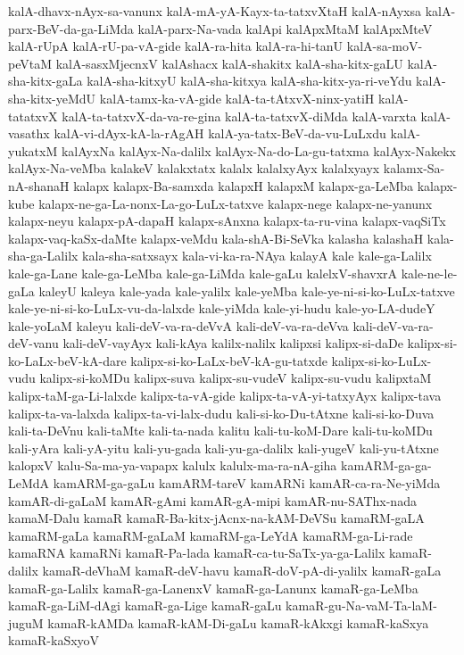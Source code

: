 {kalA-dhavx-nAyx-sa-vanunx
kalA-mA-yA-Kayx-ta-tatxvXtaH
kalA-nAyxsa
kalA-parx-BeV-da-ga-LiMda
kalA-parx-Na-vada
kalApi
kalApxMtaM
kalApxMteV
kalA-rUpA
kalA-rU-pa-vA-gide
kalA-ra-hita
kalA-ra-hi-tanU
kalA-sa-moV-peVtaM
kalA-sasxMjecnxV
kalAshacx
kalA-shakitx
kalA-sha-kitx-gaLU
kalA-sha-kitx-gaLa
kalA-sha-kitxyU
kalA-sha-kitxya
kalA-sha-kitx-ya-ri-veYdu
kalA-sha-kitx-yeMdU
kalA-tamx-ka-vA-gide
kalA-ta-tAtxvX-ninx-yatiH
kalA-tatatxvX
kalA-ta-tatxvX-da-va-re-gina
kalA-ta-tatxvX-diMda
kalA-varxta
kalA-vasathx
kalA-vi-dAyx-kA-la-rAgAH
kalA-ya-tatx-BeV-da-vu-LuLxdu
kalA-yukatxM
kalAyxNa
kalAyx-Na-dalilx
kalAyx-Na-do-La-gu-tatxma
kalAyx-Nakekx
kalAyx-Na-veMba
kalakeV
kalakxtatx
kalalx
kalalxyAyx
kalalxyayx
kalamx-Sa-nA-shanaH
kalapx
kalapx-Ba-samxda
kalapxH
kalapxM
kalapx-ga-LeMba
kalapx-kube
kalapx-ne-ga-La-nonx-La-go-LuLx-tatxve
kalapx-nege
kalapx-ne-yanunx
kalapx-neyu
kalapx-pA-dapaH
kalapx-sAnxna
kalapx-ta-ru-vina
kalapx-vaqSiTx
kalapx-vaq-kaSx-daMte
kalapx-veMdu
kala-shA-Bi-SeVka
kalasha
kalashaH
kala-sha-ga-Lalilx
kala-sha-satxsayx
kala-vi-ka-ra-NAya
kalayA
kale
kale-ga-Lalilx
kale-ga-Lane
kale-ga-LeMba
kale-ga-LiMda
kale-gaLu
kalelxV-shavxrA
kale-ne-le-gaLa
kaleyU
kaleya
kale-yada
kale-yalilx
kale-yeMba
kale-ye-ni-si-ko-LuLx-tatxve
kale-ye-ni-si-ko-LuLx-vu-da-lalxde
kale-yiMda
kale-yi-hudu
kale-yo-LA-dudeY
kale-yoLaM
kaleyu
kali-deV-va-ra-deVvA
kali-deV-va-ra-deVva
kali-deV-va-ra-deV-vanu
kali-deV-vayAyx
kali-kAya
kalilx-nalilx
kalipxsi
kalipx-si-daDe
kalipx-si-ko-LaLx-beV-kA-dare
kalipx-si-ko-LaLx-beV-kA-gu-tatxde
kalipx-si-ko-LuLx-vudu
kalipx-si-koMDu
kalipx-suva
kalipx-su-vudeV
kalipx-su-vudu
kalipxtaM
kalipx-taM-ga-Li-lalxde
kalipx-ta-vA-gide
kalipx-ta-vA-yi-tatxyAyx
kalipx-tava
kalipx-ta-va-lalxda
kalipx-ta-vi-lalx-dudu
kali-si-ko-Du-tAtxne
kali-si-ko-Duva
kali-ta-DeVnu
kali-taMte
kali-ta-nada
kalitu
kali-tu-koM-Dare
kali-tu-koMDu
kali-yAra
kali-yA-yitu
kali-yu-gada
kali-yu-ga-dalilx
kali-yugeV
kali-yu-tAtxne
kalopxV
kalu-Sa-ma-ya-vapapx
kalulx
kalulx-ma-ra-nA-giha
kamARM-ga-ga-LeMdA
kamARM-ga-gaLu
kamARM-tareV
kamARNi
kamAR-ca-ra-Ne-yiMda
kamAR-di-gaLaM
kamAR-gAmi
kamAR-gA-mipi
kamAR-nu-SAThx-nada
kamaM-Dalu
kamaR
kamaR-Ba-kitx-jAcnx-na-kAM-DeVSu
kamaRM-gaLA
kamaRM-gaLa
kamaRM-gaLaM
kamaRM-ga-LeYdA
kamaRM-ga-Li-rade
kamaRNA
kamaRNi
kamaR-Pa-lada
kamaR-ca-tu-SaTx-ya-ga-Lalilx
kamaR-dalilx
kamaR-deVhaM
kamaR-deV-havu
kamaR-doV-pA-di-yalilx
kamaR-gaLa
kamaR-ga-Lalilx
kamaR-ga-LanenxV
kamaR-ga-Lanunx
kamaR-ga-LeMba
kamaR-ga-LiM-dAgi
kamaR-ga-Lige
kamaR-gaLu
kamaR-gu-Na-vaM-Ta-laM-juguM
kamaR-kAMDa
kamaR-kAM-Di-gaLu
kamaR-kAkxgi
kamaR-kaSxya
kamaR-kaSxyoV
}
